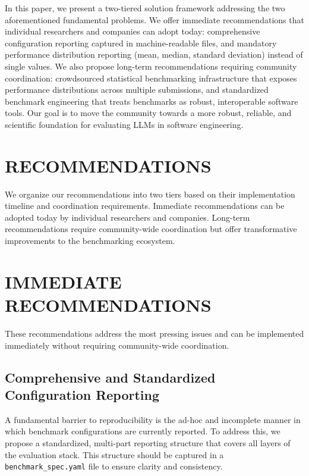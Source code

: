 \documentclass{IEEEcsmag}
\begin{document}
In this paper, we present a two-tiered solution framework addressing the two aforementioned fundamental problems. We offer immediate recommendations that individual researchers and companies can adopt today: comprehensive configuration reporting captured in machine-readable files, and mandatory performance distribution reporting (mean, median, standard deviation) instead of single values. We also propose long-term recommendations requiring community coordination: crowdsourced statistical benchmarking infrastructure that exposes performance distributions across multiple submissions, and standardized benchmark engineering that treats benchmarks as robust, interoperable software tools. Our goal is to move the community towards a more robust, reliable, and scientific foundation for evaluating LLMs in software engineering.

\section{RECOMMENDATIONS}
\label{sec:recommendations}

We organize our recommendations into two tiers based on their implementation timeline and coordination requirements. Immediate recommendations can be adopted today by individual researchers and companies. Long-term recommendations require community-wide coordination but offer transformative improvements to the benchmarking ecosystem.

\section{IMMEDIATE RECOMMENDATIONS}
\label{sec:immediate-recs}

These recommendations address the most pressing issues and can be implemented immediately without requiring community-wide coordination.

\subsection{Comprehensive and Standardized Configuration Reporting}
\label{sec:rec1}

A fundamental barrier to reproducibility is the ad-hoc and incomplete manner in which benchmark configurations are currently reported. To address this, we propose a standardized, multi-part reporting structure that covers all layers of the evaluation stack. This structure should be captured in a \texttt{benchmark\_spec.yaml} file to ensure clarity and consistency.
\end{document}

